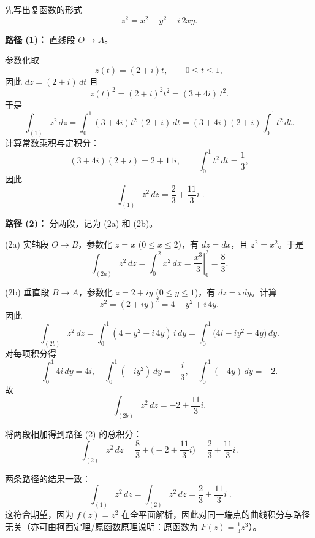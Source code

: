 \begin{solution}
先写出复函数的形式
\[
z^2 = x^2 - y^2 + i\,2xy.
\]

\textbf{路径 (1)：} 直线段 \(O\to A\)。

参数化取
\[
z(t)=(2+i)t,\qquad 0\le t\le 1,
\]
因此 \(dz=(2+i)\,dt\) 且
\[
z(t)^2=(2+i)^2 t^2=(3+4i)\,t^2.
\]
于是
\[
\int_{(1)} z^2\,dz
=\int_{0}^{1} (3+4i)t^2\,(2+i)\,dt
=(3+4i)(2+i)\int_{0}^{1} t^2\,dt.
\]
计算常数乘积与定积分：
\[
(3+4i)(2+i)=2+11i,\qquad \int_0^1 t^2\,dt=\frac{1}{3},
\]
因此
\[
\boxed{\;\int_{(1)} z^2\,dz=\frac{2}{3}+\frac{11}{3}i\;.}
\]

\bigskip

\textbf{路径 (2)：} 分两段，记为 (2a) 和 (2b)。

(2a) 实轴段 \(O\to B\)，参数化 \(z=x\) (\(0\le x\le 2\))，有 \(dz=dx\)，且 \(z^2=x^2\)。于是
\[
\int_{(2a)} z^2\,dz=\int_{0}^{2} x^2\,dx=\left.\frac{x^3}{3}\right|_{0}^{2}=\frac{8}{3}.
\]

(2b) 垂直段 \(B\to A\)，参数化 \(z=2+i y\) (\(0\le y\le 1\))，有 \(dz=i\,dy\)。计算
\[
z^2=(2+i y)^2=4- y^2 + i\,4y.
\]
因此
\[
\int_{(2b)} z^2\,dz
=\int_{0}^{1} (4- y^2 + i\,4y)\,i\,dy
=\int_{0}^{1}\big(4i - i y^2 -4y\big)\,dy.
\]
对每项积分得
\[
\int_0^1 4i\,dy = 4i,\quad
\int_0^1 (-i y^2)\,dy = -\frac{i}{3},\quad
\int_0^1 (-4y)\,dy = -2.
\]
故
\[
\int_{(2b)} z^2\,dz = -2 + \frac{11}{3}i.
\]

将两段相加得到路径 (2) 的总积分：
\[
\int_{(2)} z^2\,dz
= \frac{8}{3} + \Big(-2 + \frac{11}{3}i\Big)
= \frac{2}{3} + \frac{11}{3}i.
\]

\bigskip

两条路径的结果一致：
\[
\boxed{\;\int_{(1)} z^2\,dz=\int_{(2)} z^2\,dz=\frac{2}{3}+\frac{11}{3}i\;.}
\]
这符合期望，因为 \(f(z)=z^2\) 在全平面解析，因此对同一端点的曲线积分与路径无关（亦可由柯西定理/原函数原理说明：原函数为 \(F(z)=\tfrac{1}{3}z^3\)）。
\end{solution}



